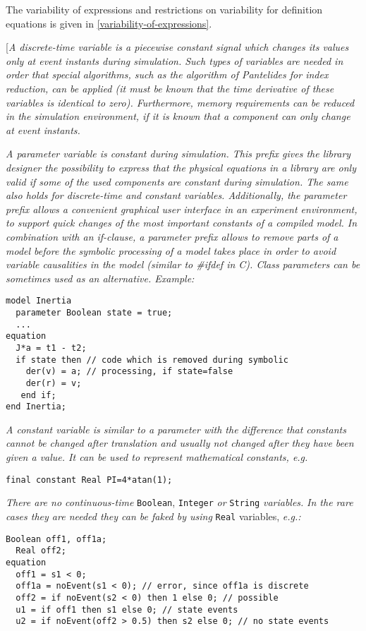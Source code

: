 The variability of expressions and restrictions on variability for
definition equations is given in \autoref{variability-of-expressions}.

{[}\emph{A discrete-time variable is a piecewise constant signal which
changes its values only at event instants during simulation. Such types
of variables are needed in order that special algorithms, such as the
algorithm of Pantelides for index reduction, can be applied (it must be
known that the time derivative of these variables is identical to zero).
Furthermore, memory requirements can be reduced in the simulation
environment, if it is known that a component can only change at event
instants. }

\emph{A parameter variable is constant during simulation. This prefix
gives the library designer the possibility to express that the physical
equations in a library are only valid if some of the used components are
constant during simulation. The same also holds for discrete-time and
constant variables. Additionally, the parameter prefix allows a
convenient graphical user interface in an experiment environment, to
support quick changes of the most important constants of a compiled
model. In combination with an if-clause, a parameter prefix allows to
remove parts of a model before the symbolic processing of a model takes
place in order to avoid variable causalities in the model (similar to
\#ifdef in C). Class parameters can be sometimes used as an alternative.
Example: }
\begin{lstlisting}[language=modelica]
model Inertia
  parameter Boolean state = true;
  ...
equation
  J*a = t1 - t2;
  if state then // code which is removed during symbolic
    der(v) = a; // processing, if state=false
    der(r) = v;
   end if;
end Inertia;
\end{lstlisting}

\emph{A constant variable is similar to a parameter with the difference
that constants cannot be changed after translation and usually not
changed after they have been given a value. It can be used to represent
mathematical constants, e.g. }
\begin{lstlisting}[language=modelica]
final constant Real PI=4*atan(1);
\end{lstlisting}

\emph{There are no continuous-time} \lstinline!Boolean!, \lstinline!Integer! \emph{or} \lstinline!String!
\emph{variables.} \emph{In the rare cases they are needed they can be
faked by using} \lstinline!Real! variables, \emph{e.g.:}
\begin{lstlisting}[language=modelica]
  Boolean off1, off1a;
  Real off2;
equation
  off1 = s1 < 0;
  off1a = noEvent(s1 < 0); // error, since off1a is discrete
  off2 = if noEvent(s2 < 0) then 1 else 0; // possible
  u1 = if off1 then s1 else 0; // state events
  u2 = if noEvent(off2 > 0.5) then s2 else 0; // no state events
\end{lstlisting}

